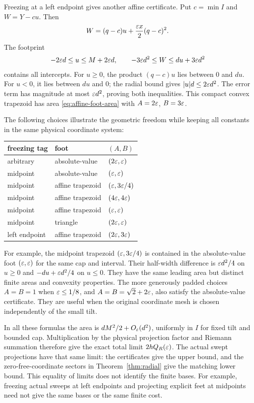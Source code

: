 Freezing at a left endpoint gives another affine certificate. Put
$c=\min I$ and $W=Y-cu$. Then
\[
 W=(q-c)u+\frac{\varepsilon x}{2}(q-c)^2.
\]
The footprint
\begin{equation}\label{eq:endpoint-affine-foot}
 -2\varepsilon d\le u\le M+2\varepsilon d,\qquad
 -3\varepsilon d^2\le W\le du+3\varepsilon d^2
\end{equation}
contains all intercepts. For $u\ge0$, the product $(q-c)u$ lies
between $0$ and $du$. For $u<0$, it lies between $du$ and $0$;
the radial bound gives $|u|d\le2\varepsilon d^2$. The error term has
magnitude at most $\varepsilon d^2$, proving both inequalities. This compact
convex trapezoid has area \eqref{eq:affine-foot-area} with
$A=2\varepsilon$, $B=3\varepsilon$.

The following choices illustrate the geometric freedom while keeping all
constants in the same physical coordinate system:
\begin{center}
\begin{tabular}{lll}
freezing tag & foot & $(A,B)$\\ \hline
arbitrary & absolute-value & $(2\varepsilon,\varepsilon)$\\
midpoint & absolute-value & $(\varepsilon,\varepsilon)$\\
midpoint & affine trapezoid & $(\varepsilon,3\varepsilon/4)$\\
midpoint & affine trapezoid & $(4\varepsilon,4\varepsilon)$\\
midpoint & affine trapezoid & $(\varepsilon,\varepsilon)$\\
midpoint & triangle & $(2\varepsilon,\varepsilon)$\\
left endpoint & affine trapezoid & $(2\varepsilon,3\varepsilon)$
\end{tabular}
\end{center}
For example, the midpoint trapezoid $(\varepsilon,3\varepsilon/4)$ is contained
in the absolute-value foot $(\varepsilon,\varepsilon)$ for the same cap and
interval. Their half-width difference is $\varepsilon d^2/4$ on $u\ge0$
and $-du+\varepsilon d^2/4$ on $u\le0$. They have the same leading
area but distinct finite areas and convexity properties.
The more generously padded choices $A=B=1$ when $\varepsilon\le1/8$,
and $A=B=\sqrt2+2\varepsilon$, also satisfy the absolute-value certificate.
They are useful when the original coordinate mesh is chosen independently
of the small tilt.

In all these formulas the area is $dM^2/2+O_\varepsilon(d^2)$, uniformly
in $I$ for fixed tilt and bounded cap. Multiplication by the physical
projection factor and Riemann summation therefore give the exact total
limit $2hQ_R(\varepsilon)$. The actual swept projections have that same limit:
the certificates give the upper bound, and the zero-free-coordinate
sectors in Theorem~\ref{thm:radial} give the matching lower bound.
This equality of limits does not identify the finite bases. For example,
freezing actual sweeps at left endpoints and projecting explicit feet at
midpoints need not give the same bases or the same finite cost.

